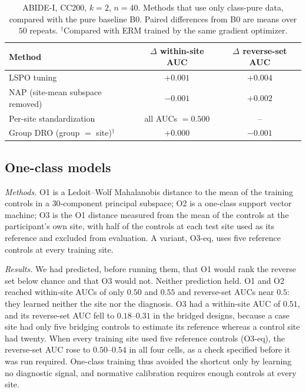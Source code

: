 \begin{table}[h]
\centering
\caption{ABIDE-I, CC200, $k=2$, $n=40$. Methods that use only class-pure data, compared with the pure baseline B0. Paired differences from B0 are means over $50$ repeats. $^{\dagger}$Compared with ERM trained by the same gradient optimizer.}
\label{tab:methods}
\begin{tabular}{lcc}
\toprule
Method & $\Delta$ within-site AUC & $\Delta$ reverse-set AUC\\
\midrule
LSPO tuning & $+0.001$ & $+0.004$\\
NAP (site-mean subspace removed) & $-0.001$ & $+0.002$\\
Per-site standardization & all AUCs $=0.500$ & --\\
Group DRO (group $=$ site)$^{\dagger}$ & $+0.000$ & $-0.001$\\
\bottomrule
\end{tabular}
\end{table}

\subsection{One-class models}

\emph{Methods.} O1 is a Ledoit--Wolf Mahalanobis distance to the mean of the training controls in a $30$-component principal subspace; O2 is a one-class support vector machine; O3 is the O1 distance measured from the mean of the controls at the participant's own site, with half of the controls at each test site used as its reference and excluded from evaluation. A variant, O3-eq, uses five reference controls at every training site.

\emph{Results.} We had predicted, before running them, that O1 would rank the reverse set below chance and that O3 would not. Neither prediction held. O1 and O2 reached within-site AUCs of only $0.50$ and $0.55$ and reverse-set AUCs near $0.5$: they learned neither the site nor the diagnosis. O3 had a within-site AUC of $0.51$, and its reverse-set AUC fell to $0.18$--$0.31$ in the bridged designs, because a case site had only five bridging controls to estimate its reference whereas a control site had twenty. When every training site used five reference controls (O3-eq), the reverse-set AUC rose to $0.50$--$0.54$ in all four cells, as a check specified before it was run required. One-class training thus avoided the shortcut only by learning no diagnostic signal, and normative calibration requires enough controls at every site.

